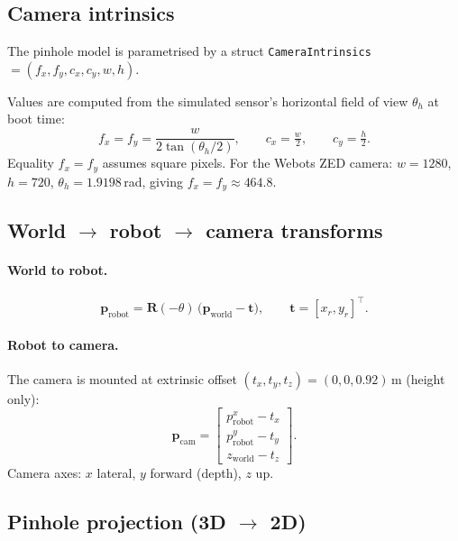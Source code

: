 \documentclass[a4paper, 11pt]{article}
\newcommand{\vect}[1]{\bm{#1}}
\newcommand{\mat}[1]{\bm{#1}}
\begin{document}
\subsection{Camera intrinsics}

The pinhole model is parametrised by a struct
\texttt{CameraIntrinsics} $= (f_x, f_y, c_x, c_y, w, h)$.

Values are computed from the simulated sensor's horizontal field of view
$\theta_h$ at boot time:
\begin{equation}\label{eq:intrinsics}
  f_x = f_y = \frac{w}{2\tan(\theta_h / 2)},
  \qquad
  c_x = \tfrac{w}{2},
  \qquad
  c_y = \tfrac{h}{2}.
\end{equation}
Equality $f_x = f_y$ assumes square pixels.
For the Webots ZED camera: $w = 1280$, $h = 720$,
$\theta_h = 1.9198\,$rad, giving $f_x = f_y \approx 464.8$.

\subsection{World $\to$ robot $\to$ camera transforms}

\paragraph{World to robot.}
\begin{equation}\label{eq:world2robot}
  \vect{p}_{\text{robot}}
  = \mat{R}(-\theta)\,\bigl(\vect{p}_{\text{world}} - \vect{t}\bigr),
  \qquad
  \vect{t} = [x_r, y_r]^\top.
\end{equation}

\paragraph{Robot to camera.}
The camera is mounted at extrinsic offset
$(t_x, t_y, t_z) = (0, 0, 0.92)\,$m (height only):
\begin{equation}\label{eq:robot2cam}
  \vect{p}_{\text{cam}}
  = \begin{bmatrix}
      p_{\text{robot}}^x - t_x \\
      p_{\text{robot}}^y - t_y \\
      z_{\text{world}} - t_z
    \end{bmatrix}.
\end{equation}
Camera axes: $x$ lateral, $y$ forward (depth), $z$ up.

\subsection{Pinhole projection (3D $\to$ 2D)}
\end{document}
